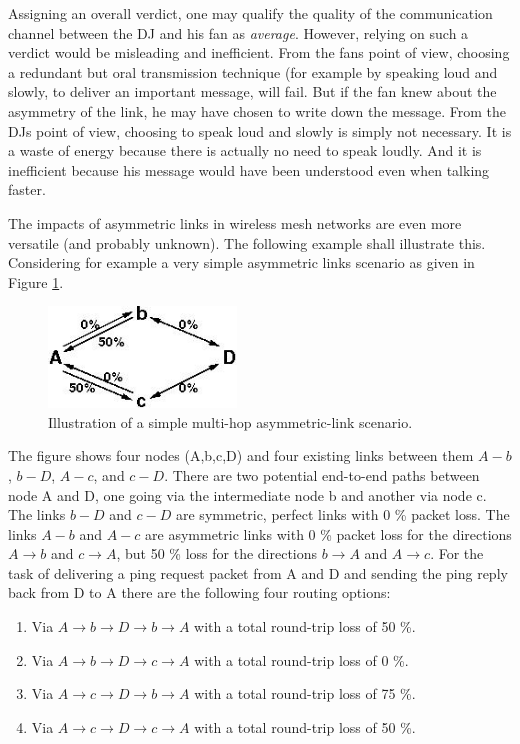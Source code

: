 \documentclass[11pt]{article}
\begin{document}
%
Assigning an overall verdict, one may qualify the quality of the communication channel between the DJ and his fan as \emph{average}. 
%
However, relying on such a verdict would be misleading and inefficient. 
%
From the fans point of view, choosing a redundant but oral transmission technique (for example by speaking loud and slowly, to deliver an important message, will fail. 
%
But if the fan knew about the asymmetry of the link, he may have chosen to write down the message.
%
From the DJs point of view, choosing to speak loud and slowly is simply not necessary.
It is a waste of energy because there is actually no need to speak loudly. And it is inefficient because his message would have been understood even when talking faster.
% 


The impacts of asymmetric links in wireless mesh networks are even more versatile (and probably unknown). The following example shall illustrate this.
%
Considering for example a very simple asymmetric links scenario as given in Figure \ref{fig:asymmetric-path}.


\begin{figure}[htbp]
  \begin{center}
    \includegraphics[width=5cm]{asymmetricPathChaos.jpg}
    \caption{Illustration of a simple multi-hop asymmetric-link scenario.}
    \label{fig:asymmetric-path}
  \end{center}
\end{figure}


The figure shows four nodes (A,b,c,D) and four existing links between them $A-b$, $b-D$, $A-c$, and $c-D$. There are two potential end-to-end paths between node A and D, one going via the intermediate node b and another via node c. 
%
The links $b-D$ and $c-D$ are symmetric, perfect links with 0 \% packet loss. 
%
The links $ A - b $ and $ A - c $ are asymmetric links with 0 \% packet loss for the directions $ A \rightarrow b $ and $ c \rightarrow A $, but 50 \% loss for the directions $ b \rightarrow A $ and $ A \rightarrow c $.
%
For the task of delivering a ping request packet from A and D and sending the ping reply back from D to A there are the following four routing options:
\begin{enumerate}
 \item Via $ A \rightarrow b \rightarrow D \rightarrow b \rightarrow A $ with a total round-trip loss of 50 \%.
 \item Via $ A \rightarrow b \rightarrow D \rightarrow c \rightarrow A $ with a total round-trip loss of 0 \%.
 \item Via $ A \rightarrow c \rightarrow D \rightarrow b \rightarrow A $ with a total round-trip loss of 75 \%.
 \item Via $ A \rightarrow c \rightarrow D \rightarrow c \rightarrow A $ with a total round-trip loss of 50 \%.
\end{enumerate}
\end{document}
